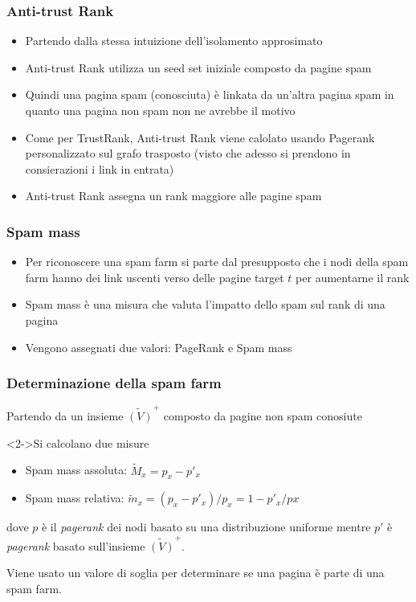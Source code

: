 \documentclass{beamer}
\begin{document}
\begin{frame}
  \frametitle{Anti-trust Rank}
  \begin{itemize}
   \item Partendo dalla stessa intuizione dell'isolamento approsimato 
   \item Anti-trust Rank utilizza un seed set iniziale composto da pagine spam
   \item Quindi una pagina spam (conosciuta) è linkata da un'altra pagina spam in quanto una pagina non spam non ne avrebbe il motivo 
   \item Come per TrustRank, Anti-trust Rank viene calolato usando Pagerank personalizzato sul grafo trasposto (visto che adesso si prendono in consierazioni i link in entrata)
   \item Anti-trust Rank assegna un rank maggiore alle pagine spam
  \end{itemize}
\end{frame}
\begin{frame}
  \frametitle{Spam mass}
  \begin{itemize}
   \item Per riconoscere una spam farm si parte dal presupposto che i nodi della spam farm hanno dei link uscenti verso delle pagine target \(t\) per aumentarne il rank
   \item Spam mass è una misura che valuta l'impatto dello spam sul rank di una pagina
   \item Vengono assegnati due valori: PageRank e Spam mass
  \end{itemize}
\end{frame}
\begin{frame}
  \frametitle{Determinazione della spam farm}
  Partendo da un insieme \(\tilde{(V)}^+\) composto da pagine non spam conosiute
   \begin{block}<2->{Si calcolano due misure}
   \begin{itemize}
    \item Spam mass assoluta: \(\tilde{M}_x=p_x-p'_x\)
     \item Spam mass relativa:  \(\tilde{m}_x=(p_x-p'_x)/p_x=1-p'_x/px\)
   \end{itemize}
   dove \(p\) è il \textit{pagerank} dei nodi basato su una distribuzione uniforme mentre \(p'\) è \textit{pagerank} basato sull'insieme \(\tilde{(V)}^+\).
   
   Viene usato un valore di soglia per determinare se una pagina è parte di una spam farm.
   \end{block}
\end{frame}
\end{document}
